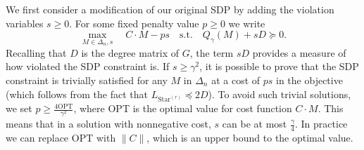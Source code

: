 \documentclass{article}
\DeclareMathOperator{\Star}{Star}
\begin{document}
We first consider a modification of our original SDP by adding the violation variables $s \geq 0$. For some fixed penalty value $p \geq 0$ we write
\begin{equation}\label{eq:opt_v}
  \max_{M \in \Delta_n, s} \quad C \cdot M - p s \quad \mathrm{s.t.} \quad Q_\gamma(M) + s D \succeq 0.
\end{equation}
Recalling that $D$ is the degree matrix of $G$, the term $s D$ provides a measure of how violated the SDP constraint is. If $s \geq \gamma^2$, it is possible to prove that the SDP constraint is trivially satisfied for any $M$ in $\Delta_n$ at a cost of $p s$ in the objective (which follows from the fact that $L_{\Star^{(r)}} \preceq 2D$). To avoid such trivial solutions, we set $p \geq \frac{4 \textrm{OPT}}{\gamma^2}$, where OPT is the optimal value for cost function $C \cdot M$. This means that in a solution with nonnegative cost, $s$ can be at most $\frac{\gamma}{4}$. In practice we can replace $\textrm{OPT}$ with $\|C\|$, which is an upper bound to the optimal value. %
\end{document}
